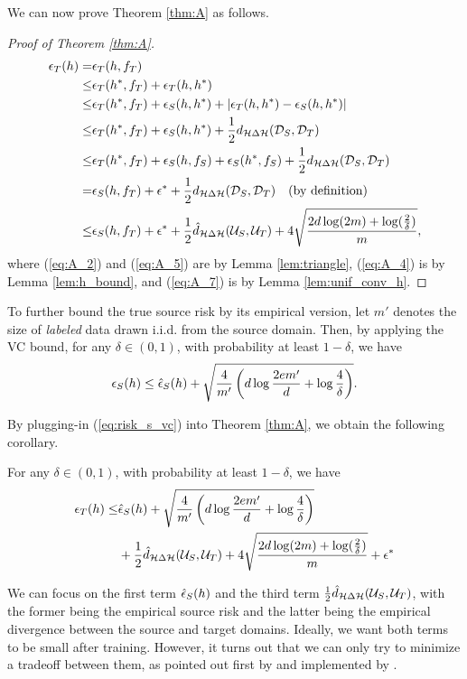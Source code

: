 We can now prove Theorem \ref{thm:A} as follows.

\begin{proof}[Proof of Theorem \ref{thm:A}]
  \begin{align}
     \epsilon_{T}(h) 
    =& \epsilon_{T}(h, f_T) \label{eq:A_1}\\
    \leq& \epsilon_{T}(h^*, f_T) + \epsilon_{T}(h, h^*) \label{eq:A_2}\\
    \leq& \epsilon_{T}(h^*, f_T) + \epsilon_{S}(h, h^*) + \left \lvert \epsilon_{T}(h, h^*) - \epsilon_{S}(h, h^*) \right \rvert \label{eq:A_3}\\
    \leq& \epsilon_{T}(h^*, f_T) + \epsilon_{S}(h, h^*) + \frac{1}{2} d_{\mathcal{H} \Delta \mathcal{H}}(\mathcal{D}_S, \mathcal{D}_T) \label{eq:A_4}\\
    \leq& \epsilon_{T}(h^*, f_T) + \epsilon_{S}(h, f_S) + \epsilon_{S}(h^*, f_S) + \frac{1}{2} d_{\mathcal{H} \Delta \mathcal{H}}(\mathcal{D}_S, \mathcal{D}_T) \label{eq:A_5}\\
    =   & \epsilon_{S}(h, f_T) + \epsilon^* + \frac{1}{2} d_{\mathcal{H} \Delta \mathcal{H}}(\mathcal{D}_S, \mathcal{D}_T) \text{\quad (by definition)} \label{eq:A_6}\\
    \leq& \epsilon_{S}(h, f_T) + \epsilon^* + \frac{1}{2} \hat{d}_{\mathcal{H} \Delta \mathcal{H}}(\mathcal{U}_S, \mathcal{U}_T)
          + 4 \sqrt{\frac{2d \log(2m) + \log(\frac{2}{\delta})}{m}}, \label{eq:A_7}
  \end{align}
  where (\ref{eq:A_2}) and (\ref{eq:A_5}) are by Lemma \ref{lem:triangle}, (\ref{eq:A_4}) is by Lemma \ref{lem:h_bound}, and (\ref{eq:A_7}) is by Lemma \ref{lem:unif_conv_h}.
\end{proof}

To further bound the true source risk by its empirical version, let $m'$ denotes the size of \textit{labeled} data drawn i.i.d. from the source domain. Then, by applying the VC bound, for any $\delta \in (0,1)$, with probability at least $1 - \delta$, we have
\begin{equation}\label{eq:risk_s_vc}
  \epsilon_{S}(h) \leq \hat{\epsilon}_{S}(h) + \sqrt{\frac{4}{m'}\left( d \log \frac{2em'}{d} + \log \frac{4}{\delta} \right)}.
\end{equation}

By plugging-in (\ref{eq:risk_s_vc}) into Theorem \ref{thm:A}, we obtain the following corollary.

\begin{corollary}\label{thm:B}
  For any $\delta \in (0,1)$, with probability at least $1 - \delta$, we have
  \begin{equation}\label{eq:B}
    \begin{aligned}
      \epsilon_{T}(h) \leq&
      \hat{\epsilon}_{S}(h) + \sqrt{\frac{4}{m'}\left( d \log \frac{2em'}{d} + \log \frac{4}{\delta} \right)} \\
      & + \frac{1}{2} \hat{d}_{\mathcal{H} \Delta \mathcal{H}}(\mathcal{U}_S, \mathcal{U}_T)
      + 4 \sqrt{\frac{2d \log(2m) + \log(\frac{2}{\delta})}{m}} 
      + \epsilon^*
    \end{aligned}
  \end{equation}
\end{corollary}

We can focus on the first term $\hat{\epsilon}_{S}(h)$ and the third term $\frac{1}{2} \hat{d}_{\mathcal{H} \Delta \mathcal{H}}(\mathcal{U}_S, \mathcal{U}_T)$, with the former being the empirical source risk and the latter being the empirical divergence between the source and target domains. Ideally, we want both terms to be small after training. However, it turns out that we can only try to minimize a tradeoff between them, as pointed out first by \cite{BenDavid2006} and implemented by \cite{Ganin2016}.

